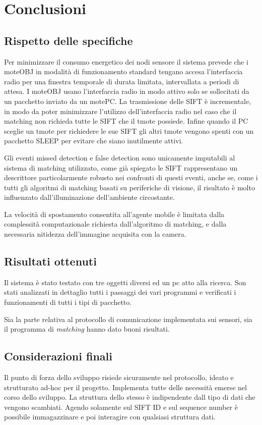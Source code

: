 \section{Conclusioni}
\subsection{Rispetto delle specifiche}
Per minimizzare il consumo energetico dei nodi sensore il sistema
prevede che i moteOBJ in modalit\`a di funzionamento standard tengano
accesa l'interfaccia radio per una finestra temporale di durata
limitata, intervallata a periodi di attesa. I moteOBJ usano
l'interfaccia radio in modo attivo solo se sollecitati da un pacchetto
inviato da un motePC. La trasmissione delle SIFT \`e incrementale, in
modo da poter minimizzare l'utilizzo dell'interfaccia radio nel caso
che il matching non richieda tutte le SIFT che il tmote
possiede. Infine quando il PC sceglie un tmote per richiedere le sue
SIFT gli altri tmote vengono spenti con un pacchetto SLEEP per evitare
che siano inutilmente attivi.

Gli eventi missed detection e false detection sono unicamente
imputabili al sistema
di matching utilizzato, come gi\`a spiegato le SIFT rappresentano un
descrittore particolarmente robusto nei confronti di questi eventi,
anche se, come i tutti gli algoritmi di matching basati su periferiche di
visione, il risultato \`e molto influenzato dall'illuminazione
dell'ambiente circostante.

La velocit\`a di spostamento consentita all'agente mobile \`e limitata
dalla complessit\`a computazionale richiesta dall'algoritmo di
matching, e dalla necessaria nitidezza dell'immagine acquisita con la
camera.

\subsection{Risultati ottenuti}
Il sistema \`e stato testato con tre oggetti diversi ed un pc atto
alla ricerca. Son stati analizzati in dettaglio tutti i passaggi dei
vari programmi e verificati i funzionamenti di tutti i tipi di
pacchetto. 

Sia la parte relativa al protocollo di comunicazione implementata sui
sensori, sia il programma di {\em matching} hanno dato buoni
risultati. 

\subsection{Considerazioni finali}
Il punto di forza dello sviluppo risiede sicuramente nel protocollo,
ideato e strutturato ad-hoc per il progetto. Implementa tutte
delle necessit\`a emerse nel corso dello sviluppo. La struttura dello
stesso \`e indipendente dall tipo di dati che vengono
scambiati. Agendo solamente sul SIFT ID e sul sequence number \`e
possibile immagazzinare e poi interagire con qualsiasi struttura dati.

